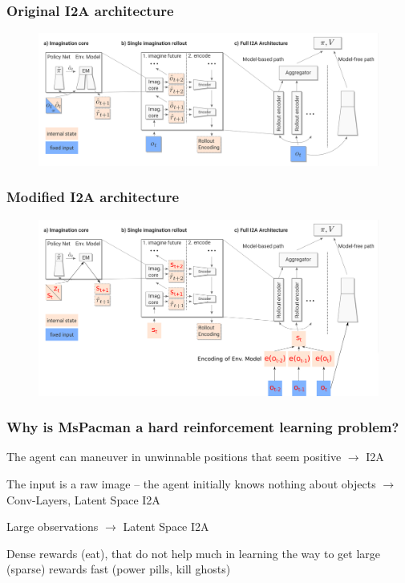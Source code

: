 \begin{frame}
	\frametitle{Original I2A architecture}
	\begin{figure}
        \centering
        \includegraphics[width=\textwidth]{./latent_i2a_images/i2a_architecture.png}
    \end{figure}
\end{frame}

\begin{frame}
	\frametitle{Modified I2A architecture}
	\begin{figure}
        \centering
        \includegraphics[width=\textwidth]{./latent_i2a_images/latent_i2a_architecture_finished3.png}
    \end{figure}
\end{frame}


\begin{frame}
	\frametitle{Why is MsPacman a hard reinforcement learning problem?}
	\begin{PraesentationAufzaehlung}
		\item The agent can maneuver in unwinnable positions that seem positive $\rightarrow$ I2A
		\item The input is a raw image -- the agent initially knows nothing about objects $\rightarrow$ Conv-Layers, Latent Space I2A
		\item Large observations $\rightarrow$ Latent Space I2A
		\item Dense rewards (eat), that do not help much in learning the way to get large (sparse) rewards fast (power pills, kill ghosts)
	\end{PraesentationAufzaehlung}
\end{frame}

